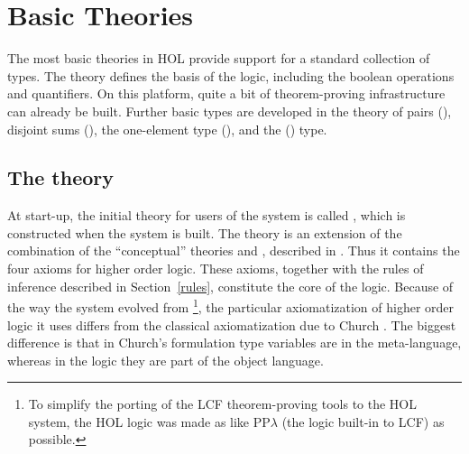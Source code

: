 \section{Basic Theories}

The most basic theories in HOL provide support for a standard
collection of types. The theory  defines the basis of
the \HOL{} logic, including the boolean operations and
quantifiers. On this platform, quite a bit of theorem-proving
infrastructure can already be built. Further basic types are developed
in the theory of pairs (), disjoint sums
(), the one-element type (), and the
() type.


\subsection{The theory }\label{boolfull}

%
At start-up, the initial theory for users of the \HOL{} system is
called , which is constructed when the
\HOL{} system is built. The theory  is an extension of
the combination of the ``conceptual'' theories  and
, described in \LOGIC.  Thus it contains the four axioms
%
%
for higher order logic. These axioms, together with the rules of
inference described in Section~\ref{rules}, constitute the core of the
\HOL{} logic.  Because of the way the \HOL{} system evolved from \LCF%
%
%
%
\footnote{To simplify the porting of the LCF theorem-proving tools to
  the HOL system, the HOL logic was made as like PP$\lambda$ (the
  logic built-in to LCF) as possible.}, the particular axiomatization
of higher order logic it uses differs from the classical
axiomatization due to Church  \cite{Church}.  The
biggest difference is that in Church's formulation type variables
%
%
are in the meta-language, whereas in the \HOL{} logic they are part of
the object language.

